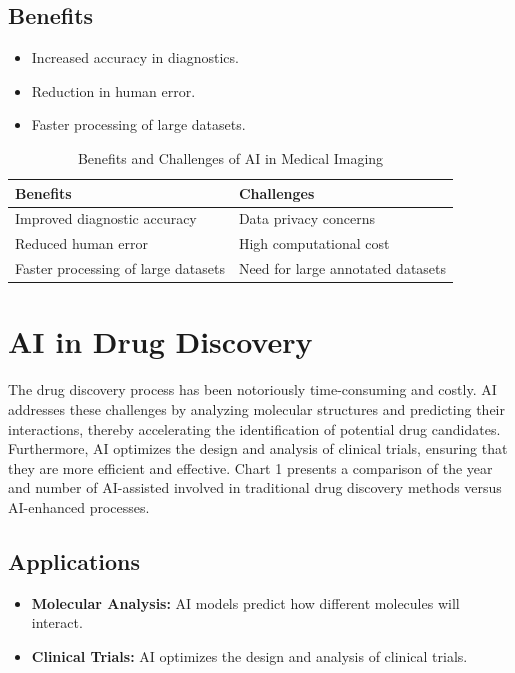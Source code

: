 \documentclass[12pt, a4paper]{article}
\begin{document}
\subsection{Benefits}
\begin{itemize}
    \item Increased accuracy in diagnostics.
    \item Reduction in human error.
    \item Faster processing of large datasets.
\end{itemize}

\begin{table}[h]
    \centering
    \renewcommand{\arraystretch}{1.5} %
    \caption{Benefits and Challenges of AI in Medical Imaging}
    \begin{tabular}{|l|l|}
        \hline
        \textbf{Benefits} & \textbf{Challenges} \\ \hline
        Improved diagnostic accuracy & Data privacy concerns \\
        Reduced human error & High computational cost \\
        Faster processing of large datasets & Need for large annotated datasets \\ \hline
    \end{tabular}
    \label{tab:ai_medical_imaging}
\end{table}



\section{AI in Drug Discovery}
The drug discovery process has been notoriously time-consuming and costly. AI addresses these challenges by analyzing molecular structures and predicting their interactions, thereby accelerating the identification of potential drug candidates. Furthermore, AI optimizes the design and analysis of clinical trials, ensuring that they are more efficient and effective. Chart 1 presents a comparison of the year and number of AI-assisted involved in traditional drug discovery methods versus AI-enhanced processes.
\subsection{Applications}
\begin{itemize}
    \item \textbf{Molecular Analysis:} AI models predict how different molecules will interact.
    \item \textbf{Clinical Trials:} AI optimizes the design and analysis of clinical trials.
\end{itemize}
\end{document}
